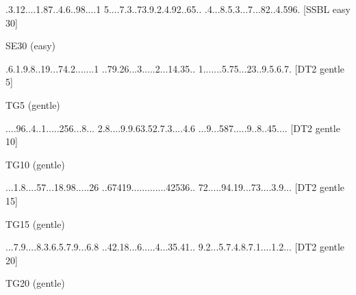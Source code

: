 \documentclass[twoside]{article}
\begin{document}
\renewcommand*{\puzzlefile}{se30.sud}
\writepuzzle%
{.3.12....}{1.87..4.6}{..98....1}%
{5....7.3.}{.73.9.2.4}{.92..65..}%
{.4...8.5.}{3...7...8}{2..4.596.}%
[SSBL easy 30]
\vfill
\begin{minipage}{0.95\linewidth}\begin{center}
SE30 (easy) \\
\end{center}\end{minipage}

\renewcommand*{\puzzlefile}{tg5.sud}
\writepuzzle%
{.6.1.9.8.}{.19...74.}{2.......1}%
{..79.26..}{.3.....2.}{..14.35..}%
{1.......5}{.75...23.}{.9.5.6.7.}%
[DT2 gentle 5]
\vfill
\begin{minipage}{0.95\linewidth}\begin{center}
TG5 (gentle) \\
\end{center}\end{minipage}

\renewcommand*{\puzzlefile}{tg10.sud}
\writepuzzle%
{....96..4}{..1.....2}{56...8...}%
{2.8....9.}{9.63.52.7}{.3....4.6}%
{...9...58}{7.....9..}{8..45....}%
[DT2 gentle 10]
\vfill
\begin{minipage}{0.95\linewidth}\begin{center}
TG10 (gentle) \\
\end{center}\end{minipage}

\renewcommand*{\puzzlefile}{tg15.sud}
\writepuzzle%
{...1.8...}{.57...18.}{98.....26}%
{..67419..}{.........}{..42536..}%
{72.....94}{.19...73.}{...3.9...}%
[DT2 gentle 15]
\vfill
\begin{minipage}{0.95\linewidth}\begin{center}
TG15 (gentle) \\
\end{center}\end{minipage}

\renewcommand*{\puzzlefile}{tg20.sud}
\writepuzzle%
{...7.9...}{.8.3.6.5.}{7.9...6.8}%
{..42.18..}{.6.....4.}{..35.41..}%
{9.2...5.7}{.4.8.7.1.}{...1.2...}%
[DT2 gentle 20]
\vfill
\begin{minipage}{0.95\linewidth}\begin{center}
TG20 (gentle) \\
\end{center}\end{minipage}
\end{document}
